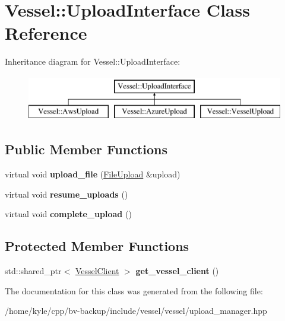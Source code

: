 \hypertarget{class_vessel_1_1_upload_interface}{}\section{Vessel\+:\+:Upload\+Interface Class Reference}
\label{class_vessel_1_1_upload_interface}
Inheritance diagram for Vessel\+:\+:Upload\+Interface\+:\begin{figure}[H]
\begin{center}
\leavevmode
\includegraphics[height=2.000000cm]{class_vessel_1_1_upload_interface}
\end{center}
\end{figure}
\subsection*{Public Member Functions}
\begin{DoxyCompactItemize}
\item 
\mbox{\label{class_vessel_1_1_upload_interface_a9608a8f2800d7f8a36bb30df386e4d5a}} 
virtual void {\bfseries upload\+\_\+file} (\hyperlink{class_vessel_1_1_file_1_1_file_upload}{File\+Upload} \&upload)
\item 
\mbox{\label{class_vessel_1_1_upload_interface_ab2f7c907ca97e28c7e7478faf5135a57}} 
virtual void {\bfseries resume\+\_\+uploads} ()
\item 
\mbox{\label{class_vessel_1_1_upload_interface_a61be77a84133c6ada34c2ac20a536bdc}} 
virtual void {\bfseries complete\+\_\+upload} ()
\end{DoxyCompactItemize}
\subsection*{Protected Member Functions}
\begin{DoxyCompactItemize}
\item 
\mbox{\label{class_vessel_1_1_upload_interface_ab69d8698fdeda1c88706ce0e7b96e97d}} 
std\+::shared\+\_\+ptr$<$ \hyperlink{class_vessel_1_1_networking_1_1_vessel_client}{Vessel\+Client} $>$ {\bfseries get\+\_\+vessel\+\_\+client} ()
\end{DoxyCompactItemize}


The documentation for this class was generated from the following file\+:\begin{DoxyCompactItemize}
\item 
/home/kyle/cpp/bv-\/backup/include/vessel/vessel/upload\+\_\+manager.\+hpp\end{DoxyCompactItemize}
